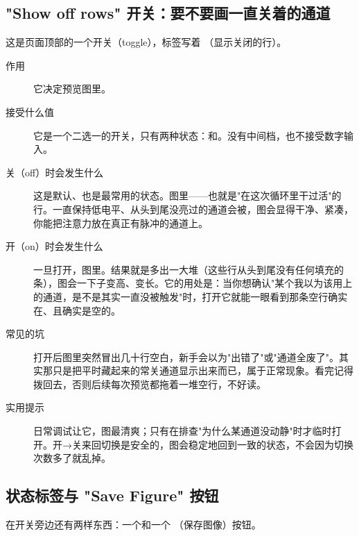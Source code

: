 \documentclass[11pt,oneside,openany]{book}
\begin{document}
\subsection{"Show off rows" 开关：要不要画一直关着的通道}

这是页面顶部的一个开关（toggle），标签写着 （显示关闭的行）。

\begin{description}
\item[作用] 它决定预览图里。
\item[接受什么值] 它是一个二选一的开关，只有两种状态：和。没有中间档，也不接受数字输入。
\item[关（off）时会发生什么] 这是默认、也是最常用的状态。图里——也就是"在这次循环里干过活"的行。一直保持低电平、从头到尾没亮过的通道会被，图会显得干净、紧凑，你能把注意力放在真正有脉冲的通道上。
\item[开（on）时会发生什么] 一旦打开，图里。结果就是多出一大堆（这些行从头到尾没有任何填充的条），图会一下子变高、变长。它的用处是：当你想确认"某个我以为该用上的通道，是不是其实一直没被触发"时，打开它就能一眼看到那条空行确实在、且确实是空的。
\item[常见的坑] 打开后图里突然冒出几十行空白，新手会以为"出错了"或"通道全废了"。其实那只是把平时藏起来的常关通道显示出来而已，属于正常现象。看完记得拨回去，否则后续每次预览都拖着一堆空行，不好读。
\item[实用提示] 日常调试让它，图最清爽；只有在排查"为什么某通道没动静"时才临时打开。开→关来回切换是安全的，图会稳定地回到一致的状态，不会因为切换次数多了就乱掉。
\end{description}

\subsection{状态标签与 "Save Figure" 按钮}

在开关旁边还有两样东西：一个和一个 （保存图像）按钮。
\end{document}
